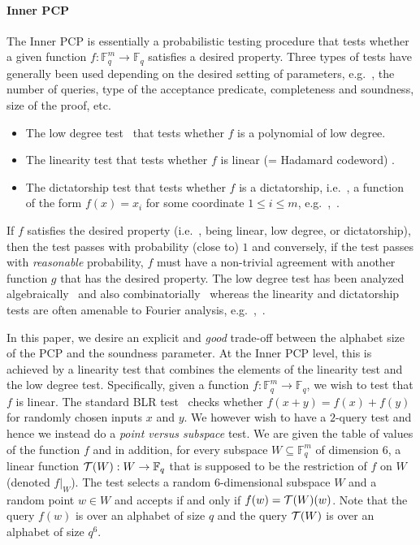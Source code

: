 \documentclass[10pt]{article}
\theoremstyle{definition}
\providecommand{\eg}{e.g.\ }
\providecommand{\ie}{i.e.\ }
\numberwithin{equation}{section}
\newcommand\calT{{\cal T}}
\newcommand\F{\mathbb{F}}
\renewcommand{\mapsto}{\to}
\begin{document}
\paragraph{Inner PCP}
The Inner PCP is essentially a probabilistic
testing procedure that tests whether a given function $f: \F_q^m \mapsto \F_q$
satisfies a desired property. Three types of tests have generally been used depending
on the desired setting of parameters, \eg, the number of queries, type of the
acceptance predicate,
completeness and soundness, size of the proof, etc.
\begin{itemize}
\item The low degree test~\cite{FGLSS, AS, AroraSudan, RazSafra} that tests whether $f$ is a polynomial of low degree.
\item The linearity test that tests whether $f$ is linear (= Hadamard codeword) \cite{ALMSS, Kh-maxclique}.
\item The dictatorship test that tests whether $f$ is a dictatorship, \ie, a function
of the form $f(x)=x_i$ for some coordinate $1 \leq i \leq m$, \eg,~\cite{BGS, Has96, Has97}.
\end{itemize}
If $f$ satisfies the desired property (\ie, being linear, low degree, or dictatorship),
then the test passes with probability
(close to) $1$ and conversely, if the test passes with \emph{reasonable} probability,
$f$ must have a non-trivial agreement with another function $g$ that has the desired property.
The low degree test has been analyzed algebraically~\cite{FGLSS, AS, AroraSudan}
and also combinatorially~\cite{RazSafra}
whereas the linearity and dictatorship tests are often amenable to
Fourier analysis, \eg,~\cite{Kh-maxclique, Has96, Has97, KKMO}.

In this paper, we desire an explicit and \emph{good} trade-off between the alphabet size of the PCP and the
soundness parameter. At the Inner PCP level, this is achieved by a linearity test that combines
the elements of the linearity test and the low degree test. Specifically, given
a function  $f: \F_q^m \mapsto \F_q$, we wish to test that $f$ is linear. The standard
BLR test~\cite{BLR}
checks whether $f(x+y)=f(x)+f(y)$ for randomly chosen inputs $x$ and $y$. We
however wish to have a $2$-query test and hence we instead do a \emph{point versus subspace}
test. We are given the table of values of the function $f$ and in addition, for
every subspace $W \subseteq \F_q^m$ of dimension $6$, a linear function $\calT(W): W \mapsto \F_q$
that is
supposed to be the restriction of $f$ on $W$ (denoted $f|_W$). The test selects a random $6$-dimensional
subspace $W$ and a random point $w \in W$ and accepts if and only if
$f(w) = \calT(W) (w)$. Note that the query $f(w)$ is over an alphabet of size $q$ and the
query $\calT(W)$ is over an alphabet of size $q^6$.
\end{document}
